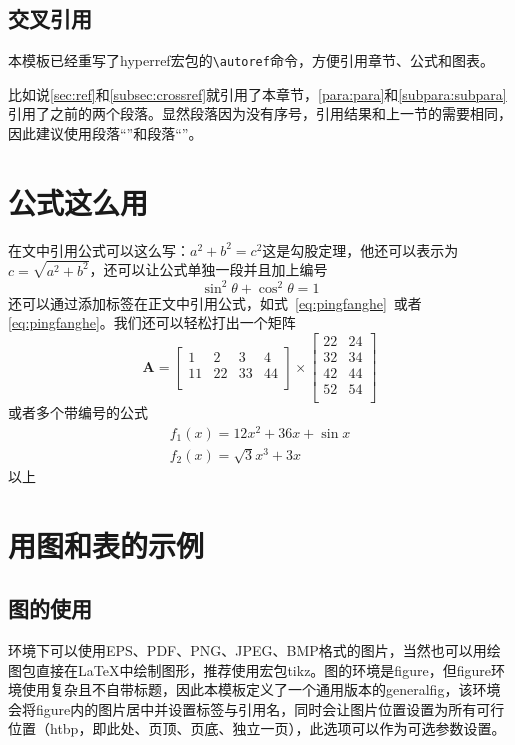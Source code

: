 \documentclass[supercite]{HustGraduPaper}
\begin{document}
\subsection{交叉引用}\label{subsec:crossref}
本模板已经重写了hyperref宏包的\verb|\autoref|命令，方便引用章节、公式和图表。

比如说\autoref{sec:ref}和\autoref{subsec:crossref}就引用了本章节，\autoref{para:para}和\autoref{subpara:subpara}引用了之前的两个段落。显然段落因为没有序号，引用结果和上一节的需要相同，因此建议使用段落“”和段落“”。

\section{公式这么用}
在文中引用公式可以这么写：$a^2+b^2=c^2$这是勾股定理，他还可以表示为$c=\sqrt{a^2+b^2}$，还可以让公式单独一段并且加上编号
\begin{equation}
	\sin^2{\theta}+\cos^2{\theta}=1 \label{eq:pingfanghe}
\end{equation}
还可以通过添加标签在正文中引用公式，如式~\eqref{eq:pingfanghe}~或者\autoref{eq:pingfanghe}。我们还可以轻松打出一个矩阵
\begin{equation}
	\bm{A}=\begin{bmatrix}
		1  & 2  & 3  & 4  \\
		11 & 22 & 33 & 44 \\
	\end{bmatrix}
	\times\begin{bmatrix}
		22 & 24 \\
		32 & 34 \\
		42 & 44 \\
		52 & 54 \\
	\end{bmatrix}
\end{equation}
或者多个带编号的公式
\begin{eqnarray}
	f_1(x)=12x^2+36x+\sin x\\
	f_2(x)=\sqrt{3}{x^3+3x}
\end{eqnarray}
以上

\section{用图和表的示例}
\subsection{图的使用}
\XeLaTeX 环境下可以使用EPS、PDF、PNG、JPEG、BMP格式的图片，当然也可以用绘图包直接在\LaTeX 中绘制图形，推荐使用宏包tikz。图的环境是figure，但figure环境使用复杂且不自带标题，因此本模板定义了一个通用版本的generalfig，该环境会将figure内的图片居中并设置标签与引用名，同时会让图片位置设置为所有可行位置（htbp，即此处、页顶、页底、独立一页），此选项可以作为可选参数设置。
\end{document}
